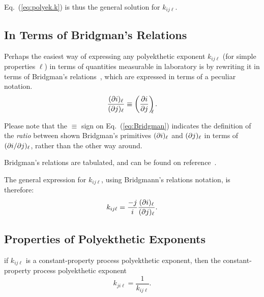     Eq.~(\ref{eq:polyek.k}) is thus the general solution for $k_{ij\ell}$.

    \subsection{In Terms of Bridgman's Relations}

    Perhaps the easiest way of expressing any polyekthetic  exponent  $k_{ij\ell}$  (for  simple
    properties $\ell$) in terms of quantities measurable in laboratory is  by  rewriting  it  in
    terms of Bridgman's relations~\cite{2006-BejanA-Wiley}, which are expressed in  terms  of  a
    peculiar notation.
    \begin{equation}
        \frac{(\partial {{i}})_{{\ell}}}{(\partial {{j}})_{{\ell}}} \equiv \left(\frac{\partial {{i}}}{\partial {{j}}}\right)_{\!\!\!{\ell}}.
        \label{eq:Bridgman}
    \end{equation}

    Please note that the $\equiv$ sign on Eq.~(\ref{eq:Bridgman}) indicates  the  definition  of
    the \emph{ratio} between shown Bridgman's primitives $(\partial {{i}})_{{\ell}}$ and $(\partial {{j}})_{{\ell}}$ in  terms
    of $({\partial {{i}}}/{\partial {{j}}})_{{\ell}}$, rather than the other way around.

    Bridgman's relations are tabulated, and can be found on reference~\cite{2006-BejanA-Wiley}.

    The general expression for $k_{ij\ell}$, using Bridgmann's relations notation, is therefore:
    \begin{equation}
        k_{ij\ell} = \frac{-j}{i}\frac{(\partial {{i}})_{{\ell}}}{(\partial {{j}})_{{\ell}}}.
        \label{eq:k.bri}
    \end{equation}

    \subsection{Properties of Polyekthetic Exponents}

    \begin{theorem}\label{the:k.recip}
        if  $k_{ij\ell}$  is  a  constant-property  process  polyekthetic  exponent,  then   the
        constant-property process polyekthetic exponent
        \begin{equation}
            k_{ji\ell} = \frac{1}{k_{ij\ell}}.
            \label{eq:k.recipr}
        \end{equation}
    \end{theorem}

